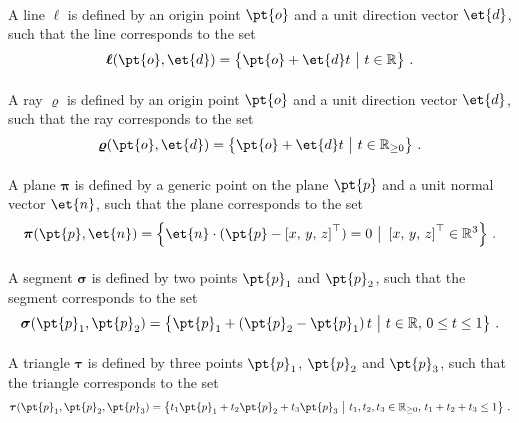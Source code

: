 \paragraph{\Line{}}
A line $\boldsymbol{\ell}$ is defined by an origin point $\pt{o}$ and a unit direction vector $\et{d}$, such that the line corresponds to the set
%
\begin{equation*}
  \boldsymbol{\ell}(\pt{o}, \et{d}) = \left\{ \pt{o} + \et{d} t ~ \big| ~ t \in \mathbb{R} \right\} \, \text{.}
\end{equation*}

\paragraph{\Ray{}}
A ray $\boldsymbol{\varrho}$ is defined by an origin point $\pt{o}$ and a unit direction vector $\et{d}$, such that the ray corresponds to the set
%
\begin{equation*}
  \boldsymbol{\varrho}(\pt{o}, \et{d}) = \left\{ \pt{o} + \et{d} t ~ \big| ~ t \in \mathbb{R}_{\ge0} \right\} \, \text{.}
\end{equation*}

\paragraph{\Plane{}}
A plane $\boldsymbol{\pi}$ is defined by a generic point on the plane $\pt{p}$ and a unit normal vector $\et{n}$, such that the plane corresponds to the set
%
\begin{equation*}
  \boldsymbol{\pi}(\pt{p}, \et{n}) = \left\{ \et{n} \cdot (\pt{p} - \left[x, \, y, \, z\right]^{\top}) = 0 ~ \big| ~ \left[x, \, y, \, z\right]^{\top} \in \mathbb{R}^3 \right\} \, \text{.}
\end{equation*}

\paragraph{\Segment{}}
A segment $\boldsymbol{\sigma}$ is defined by two points $\pt{p}_1$ and $\pt{p}_2$, such that the segment corresponds to the set
%
\begin{equation*}
  \boldsymbol{\sigma}(\pt{p}_1, \pt{p}_2) = \left\{ \pt{p}_1 + \left(\pt{p}_2-\pt{p}_1\right)t ~ \big| ~ t \in \mathbb{R}, \, 0 \le t \le 1 \right\} \, \text{.}
\end{equation*}

\paragraph{\Triangle{}}
A triangle $\boldsymbol{\tau}$ is defined by three points $\pt{p}_1$, $\pt{p}_2$ and $\pt{p}_3$, such that the triangle corresponds to the set
%
\begin{equation*}
  \boldsymbol{\tau}(\pt{p}_1, \pt{p}_2, \pt{p}_3) = \left\{ t_1\pt{p}_1 + t_2\pt{p}_2 + t_3\pt{p}_3 ~ \big| ~ t_1, t_2, t_3 \in \mathbb{R}_{\ge0}, \, t_1 + t_2+t_3 \le 1 \right\} \, \text{.}
\end{equation*}

